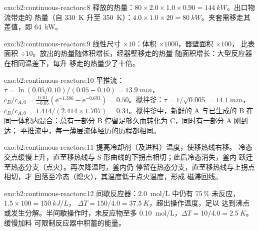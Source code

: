 \begin{solution}{exo:b2:continuous-reactors:8}
释放的热量：$80 \times 2.0 \times 1.0 \times 0.90 = \qty{144}{kW}$。出口物流带走的
热量（自 \qty{330}{K} 升至 \qty{350}{K}）：$4.0 \times 1.0 \times 20 =
\qty{80}{kW}$。夹套需移走其差值，即 \qty{64}{kW}。
\end{solution}

\begin{solution}{exo:b2:continuous-reactors:9}
线性尺寸 $\times 10$：体积 $\times 1000$，器壁面积 $\times 100$，
比表面积 $\div 10$。放出的热量随体积增长，经器壁移走的热量
随面积增长：大型反应器在相同温差下，每升
移走的热量少了十倍。
\end{solution}

\begin{solution}{exo:b2:continuous-reactors:10}
平推流：$\tau = \ln(0.05/0.10)/(0.05 - 0.10) = \qty{13.9}{min}$，$c_B/c_{A,0} =
\frac{0.10}{-0.05}(\mathrm e^{-1.386} - \mathrm e^{-0.693}) = 0.50$。搅拌釜：$\tau =
1/\sqrt{0.005} = \qty{14.1}{min}$，$c_B/c_{A,0} = 1.414/(2.414 \times 1.707) =
0.34$。搅拌釜中，新鲜的 A 与已生成的 B 在同一体积内混合：总有一部分
B 停留足够久而转化为 C，同时有一部分 A 刚到达；
平推流中，每一薄层流体经历的历程都相同。
\end{solution}

\begin{solution}{exo:b2:continuous-reactors:11}
提高冷却剂（及进料）温度，使移热线右移。
冷态交点缓慢上升，直至移热线与
S 形曲线的下拐点相切；此后冷态消失，釜内
跃迁至热态分支（点火）。再次降温时，釜内仍
停留在热态分支，直至移热线与上拐点相切，才
回落至冷态（熄火），其温度低于点火温度，形成
磁滞回线。
\end{solution}

\begin{solution}{exo:b2:continuous-reactors:12}
间歇反应器：\qty{2.0}{mol/L} 中仍有 75\,\% 未反应，$1.5 \times 100 = \qty{150}{kJ/L}$，
$\Delta T = 150/4.0 = \qty{37.5}{K}$，超出操作温度，足以
达到沸点或发生分解。半间歇操作时，未反应物至多
\qty{0.10}{mol/L}，$\Delta T = 10/4.0 = \qty{2.5}{K}$。缓慢加料
可限制反应器中积蓄的能量。
\end{solution}

